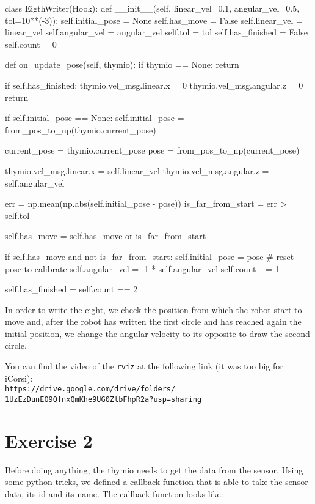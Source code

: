 \documentclass[11pt]{article}
\begin{document}
\begin{python}
class EigthWriter(Hook):
    def __init__(self, linear_vel=0.1, angular_vel=0.5, tol=10**(-3)):
        self.initial_pose = None
        self.has_move = False
        self.linear_vel = linear_vel
        self.angular_vel = angular_vel
        self.tol = tol
        self.has_finished = False
        self.count = 0

    def on_update_pose(self, thymio):
        if thymio == None: return

        if self.has_finished: 
            thymio.vel_msg.linear.x = 0
            thymio.vel_msg.angular.z = 0
            return
        
        if self.initial_pose == None: self.initial_pose = from_pos_to_np(thymio.current_pose)

        current_pose = thymio.current_pose
        pose = from_pos_to_np(current_pose)

        thymio.vel_msg.linear.x = self.linear_vel
        thymio.vel_msg.angular.z = self.angular_vel

        err = np.mean(np.abs(self.initial_pose - pose))
        is_far_from_start = err > self.tol 

        self.has_move = self.has_move or is_far_from_start

        if self.has_move and not is_far_from_start:
            self.initial_pose = pose # reset pose to calibrate
            self.angular_vel  = -1 * self.angular_vel
            self.count += 1
        
        self.has_finished =  self.count == 2
	
\end{python}
In order to write the eight, we check the position from which the robot start to move and, after the robot has written the first circle and has reached again the initial position, we change the angular velocity to its opposite to draw the second circle.

You can find the video of the \texttt{rviz} at the following link (it was too big for iCorsi):\\
\texttt{https://drive.google.com/drive/folders/\\1UzEzDunEO9QfnxQmKhe9UG0ZlbFhpR2a?usp=sharing}

\section{Exercise 2}
Before doing anything, the thymio needs to get the data from the sensor. Using some python tricks, we defined a callback function that is able to take the sensor data, its id and its name. The callback function looks like:
\end{document}
